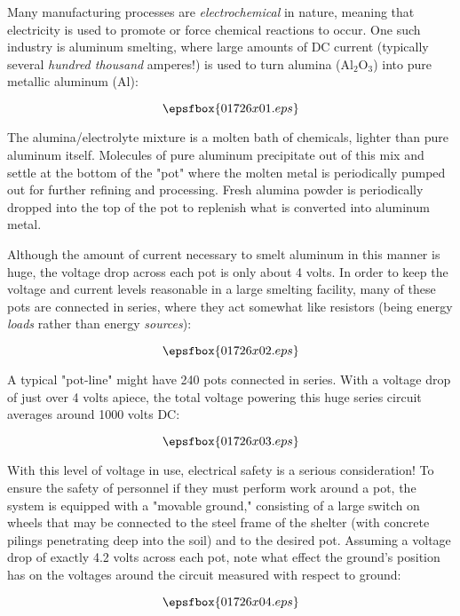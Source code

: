 

Many manufacturing processes are {\it electrochemical} in nature, meaning that electricity is used to promote or force chemical reactions to occur.  One such industry is aluminum smelting, where large amounts of DC current (typically several {\it hundred thousand} amperes!) is used to turn alumina (Al$_{2}$O$_{3}$) into pure metallic aluminum (Al):

$$\epsfbox{01726x01.eps}$$

The alumina/electrolyte mixture is a molten bath of chemicals, lighter than pure aluminum itself.  Molecules of pure aluminum precipitate out of this mix and settle at the bottom of the "pot" where the molten metal is periodically pumped out for further refining and processing.  Fresh alumina powder is periodically dropped into the top of the pot to replenish what is converted into aluminum metal.

Although the amount of current necessary to smelt aluminum in this manner is huge, the voltage drop across each pot is only about 4 volts.  In order to keep the voltage and current levels reasonable in a large smelting facility, many of these pots are connected in series, where they act somewhat like resistors (being energy {\it loads} rather than energy {\it sources}):

$$\epsfbox{01726x02.eps}$$

A typical "pot-line" might have 240 pots connected in series.  With a voltage drop of just over 4 volts apiece, the total voltage powering this huge series circuit averages around 1000 volts DC:

$$\epsfbox{01726x03.eps}$$

With this level of voltage in use, electrical safety is a serious consideration!  To ensure the safety of personnel if they must perform work around a pot, the system is equipped with a "movable ground," consisting of a large switch on wheels that may be connected to the steel frame of the shelter (with concrete pilings penetrating deep into the soil) and to the desired pot.  Assuming a voltage drop of exactly 4.2 volts across each pot, note what effect the ground's position has on the voltages around the circuit measured with respect to ground:

$$\epsfbox{01726x04.eps}$$

